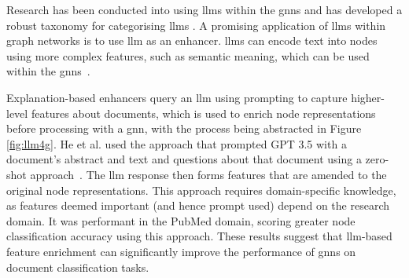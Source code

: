 \documentclass[10pt,oneside]{book}
\begin{document}
Research has been conducted into using \gls*{llm}s within the \gls*{gnn}s and has developed a robust taxonomy for categorising \gls*{llm}s \cite{ren_survey_2024}. A promising application of \gls*{llm}s within graph networks is to use \gls*{llm} as an enhancer. \gls*{llm}s can encode text into nodes using more complex features, such as semantic meaning, which can be used within the \gls*{gnn}s~\cite{zolnai-lucas_stage_2024}.
    
Explanation-based enhancers query an \gls*{llm} using prompting to capture higher-level features about documents, which is used to enrich node representations before processing with a \gls*{gnn}, with the process being abstracted in Figure \ref{fig:llm4g}. He et al. used the approach that prompted GPT 3.5 with a document's abstract and text and questions about that document using a zero-shot approach~\cite{he_harnessing_2024}. The \gls*{llm} response then forms features that are amended to the original node representations. This approach requires domain-specific knowledge, as features deemed important (and hence prompt used) depend on the research domain. It was performant in the PubMed domain, scoring greater node classification accuracy using this approach. These results suggest that \gls*{llm}-based feature enrichment can significantly improve the performance of \gls*{gnn}s on document classification tasks.
\end{document}

